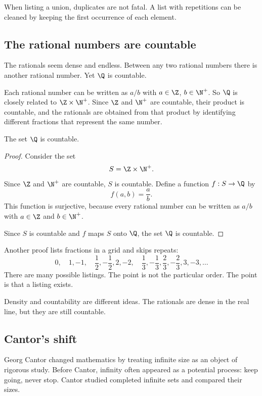 \begin{trapbox}
When listing a union, duplicates are not fatal. A list with repetitions can be cleaned by keeping the first occurrence of each element.
\end{trapbox}

\subsection{The rational numbers are countable}

The rationals seem dense and endless. Between any two rational numbers there is another rational number. Yet $\Q$ is countable.

Each rational number can be written as $a/b$ with $a\in\Z$, $b\in\N^+$. So $\Q$ is closely related to $\Z\times\N^+$. Since $\Z$ and $\N^+$ are countable, their product is countable, and the rationals are obtained from that product by identifying different fractions that represent the same number.

\begin{theorem}
The set $\Q$ is countable.
\end{theorem}

\begin{proof}
Consider the set
\[
S=\Z\times\N^+.
\]
Since $\Z$ and $\N^+$ are countable, $S$ is countable. Define a function $f:S\to\Q$ by
\[
f(a,b)=\frac{a}{b}.
\]
This function is surjective, because every rational number can be written as $a/b$ with $a\in\Z$ and $b\in\N^+$.

Since $S$ is countable and $f$ maps $S$ onto $\Q$, the set $\Q$ is countable.
\end{proof}

Another proof lists fractions in a grid and skips repeats:
\[
0,\quad 1,-1,\quad \frac12,-\frac12,2,-2,\quad \frac13,-\frac13,\frac23,-\frac23,3,-3,\ldots
\]
There are many possible listings. The point is not the particular order. The point is that a listing exists.

\begin{intuitionbox}
Density and countability are different ideas. The rationals are dense in the real line, but they are still countable.
\end{intuitionbox}

\subsection{Cantor's shift}

Georg Cantor changed mathematics by treating infinite size as an object of rigorous study. Before Cantor, infinity often appeared as a potential process: keep going, never stop. Cantor studied completed infinite sets and compared their sizes.

